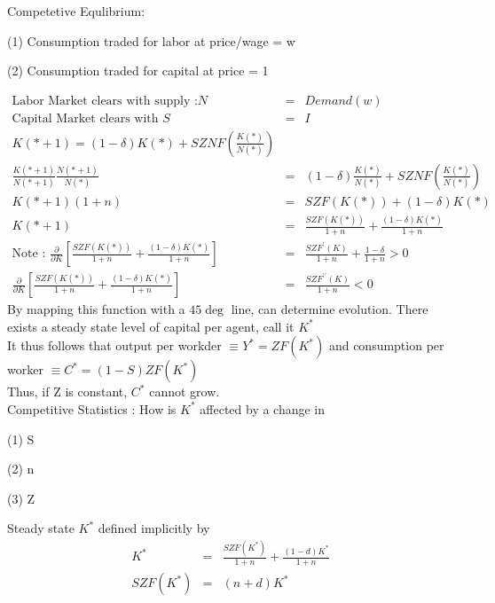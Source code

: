 Competetive Equlibrium:
\begin{list}{ }{}
\item (1) Consumption traded for labor at price/wage = w
\item (2) Consumption traded for capital at price = 1
\end{list}
\begin{eqnarray*}
\mbox{Labor Market clears with supply :} N &=& Demand(w)\\
\mbox{Capital Market clears with } S &=& I\\
K(*+1) = (1-\delta) K(*) + SZNF\left( \frac{K(*)}{N(*)}\right)\\
\frac{K(*+1)}{N(*+1)} \frac{N(*+1)}{N(*)} &=& (1-\delta) \frac{K(*)}{N(*)} + SZNF\left( \frac{K(*)}{N(*)}\right)\\
K(*+1) (1+n) &=& SZF(K(*)) + (1-\delta) K(*)\\
K(*+1) &=& \frac{SZF(K(*))}{1+n} + \frac{(1-\delta) K(*)}{1+n}\\
\mbox{Note : } \frac{\partial}{\partial K}\left[ \frac{SZF(K(*))}{1+n} + \frac{(1-\delta) K(*)}{1+n}\right] &=& \frac{SZF^\prime(K)}{1+n} + \frac{1-\delta}{1+n} > 0\\
\frac{\partial}{\partial K}\left[ \frac{SZF(K(*))}{1+n} + \frac{(1-\delta) K(*)}{1+n}\right] &=& \frac{SZF^{\prime\prime}(K)}{1+n} < 0 
\end{eqnarray*}
By mapping this function with a $45\deg$ line, can determine evolution. There exists a steady state level of capital per agent, call it $K^*$ \\

It thus follows that output per workder $\equiv Y^* = ZF(K^*)$ and consumption per worker $\equiv C^* = (1-S)ZF(K^*)$\\

Thus, if Z is constant, $C^*$ cannot grow.\\

Competitive Statistics : How is $K^*$ affected by a change in 
\begin{list}{ }{}
\item (1) S
\item (2) n
\item (3) Z
\end{list}

Steady state $K^*$ defined implicitly by 
\begin{eqnarray*}
K^* &=& \frac{SZF(K^*)}{1+n} + \frac{(1-d)K^*}{1+n}\\
SZF(K^*) &=& (n+d) K^*
\end{eqnarray*}


